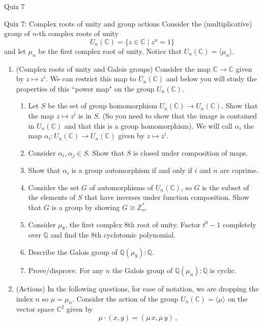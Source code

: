 \documentclass[12pt]{article}
\begin{document}
\begin{quiz}{Quiz 7}
\begin{essay}[response field lines=5,attachments allowed=0]{Quiz 7: Complex roots of unity and group actions} 
Consider the (multiplicative) group of $n$-th complex roots of unity
\[U_n(\mathbb{C})=\{z \in \mathbb{C} \mid z^n=1\}\]
and let $\mu_n$ be the first complex root of unity. Notice that $U_n(\mathbb{C})=\langle \mu_n\rangle$.
\begin{enumerate}
\item (Complex roots of unity and Galois groups) Consider the map $\mathbb{C} \to \mathbb{C}$ given by $z \mapsto z^i$. We can restrict this map to $U_n(\mathbb{C})$ and below you will study the properties of this ``power map" on the group $U_n(\mathbb{C})$.
\begin{enumerate}
\item Let $S$ be the set of group homomorphism $U_n(\mathbb{C}) \to U_n(\mathbb{C})$. Show that the map $z \mapsto z^i$ is in $S$. (So you need to show that the image is contained in $U_n(\mathbb{C})$ and that this is a group homomorphism). We will call $\alpha_i$ the map $\alpha_i: U_n(\mathbb{C}) \to U_n(\mathbb{C})$ given by $z \mapsto z^i$.  
    \item  Consider $\alpha_i, \alpha_j \in S$. Show that $S$ is closed under composition of maps.
    \item Show that $\alpha_i$ is a group automorphism if and only if $i$ and $n$ are coprime.
    \item Consider the set $G$ of automorphisms of $U_n(\mathbb{C})$, so $G$ is the subset of the elements of $S$ that have inverses under function composition. Show that $G$ is a group by showing $G \cong \mathbb{Z}_n^*$.
    \item Consider $\mu_8$, the first complex 8th root of unity. Factor $t^8-1$ completely over $\mathbb{Q}$ and find the 8th cyclotomic polynomial.
    \item Describe the Galois group of $\mathbb{Q}(\mu_8):\mathbb{Q}$.
    \item Prove/disprove. For any $n$ the Galois group of $\mathbb{Q}(\mu_n):\mathbb{Q}$ is cyclic.
    \end{enumerate}    
\item (Actions)  In the following questions, for ease of notation, we are dropping the index $n$ so $\mu=\mu_n$. Consider the action of the group $U_n(\mathbb{C})=\langle \mu \rangle$ on the vector space $\mathbb{C}^2$ given by 
\[\mu \cdotp (x , y) = (\mu\,   x , \overline{\mu} \,   y) \, ,\] 

\end{enumerate}
\end{essay}
\end{quiz}
\end{document}
